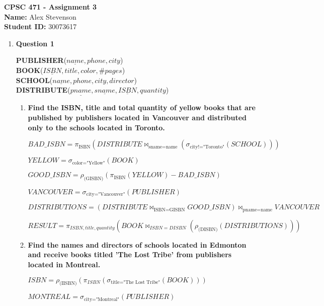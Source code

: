 \documentclass[11pt]{article}
\begin{document}
	
\begin{center}
{\bf \Large CPSC 471 - Assignment 3} \\
\textbf{Name:} Alex Stevenson \\
\textbf{Student ID:} 30073617
\end{center}

\begin{enumerate} \itemsep 1pt
	
\item[] \textbf{Question 1}

\begin{center}
\textbf{PUBLISHER}($\underline{name}, phone, city$) \\
\textbf{BOOK}($\underline{ISBN}, title, color, \#pages$) \\
\textbf{SCHOOL}($\underline{name}, phone, city, director$) \\
\textbf{DISTRIBUTE}($\underline{pname}, \underline{sname}, \underline{ISBN}, quantity$)
\end{center}

\begin{enumerate}
	
	\item \textbf{Find the ISBN, title and total quantity of yellow books that are published by publishers located	in Vancouver and distributed only to the schools located in Toronto.}
	
	$BAD\_ISBN = \pi_{\text{ISBN}} (DISTRIBUTE \Join_{\text{sname=name}} (\sigma _{\text{city!="Toronto"}} (SCHOOL)))$
	
	$YELLOW = \sigma_{\text{color="Yellow"}}(BOOK)$
	
	$GOOD\_ISBN = \rho_{\text{(GISBN)}}(\pi_{\text{ISBN}}(YELLOW) - BAD\_ISBN)$
	
	$VANCOUVER = \sigma _{\text{city="Vancouver"}}(PUBLISHER)$
	
	$DISTRIBUTIONS = (DISTRIBUTE \Join_{\text{ISBN=GISBN}} GOOD\_ISBN) \Join_{\text{pname=name}} VANCOUVER$
	
	$RESULT= \pi_{ISBN, title, quantity} (BOOK \Join_{ISBN=DISBN} (\rho_{\text{(DISBN)}} (DISTRIBUTIONS)))$
	
	\item \textbf{Find the names and directors of schools located in Edmonton and receive books titled 'The Lost Tribe' from publishers located in Montreal.}
	
	$ISBN = \rho_{\text{(IISBN)}} (\pi_{ISBN} (\sigma_{\text{title="The Lost Tribe"}}(BOOK)))$
	
	$MONTREAL = \sigma_{\text{city="Montreal"}}(PUBLISHER)$
	

\end{enumerate}
\end{enumerate}
\end{document}
